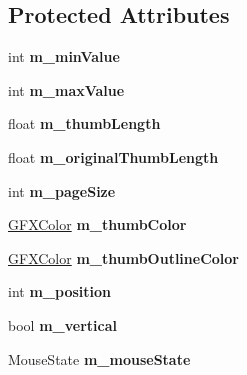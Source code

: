 \subsection*{Protected Attributes}
\begin{DoxyCompactItemize}
\item 
int {\bfseries m\+\_\+min\+Value}\hypertarget{classSlider_a84edf59ddaa7ab97a36d6a1ddb73a77b}{}\label{classSlider_a84edf59ddaa7ab97a36d6a1ddb73a77b}

\item 
int {\bfseries m\+\_\+max\+Value}\hypertarget{classSlider_a393ba2cefa5d20e4274375f6cc6f874d}{}\label{classSlider_a393ba2cefa5d20e4274375f6cc6f874d}

\item 
float {\bfseries m\+\_\+thumb\+Length}\hypertarget{classSlider_a1c7103d35675567e874483534c57cb93}{}\label{classSlider_a1c7103d35675567e874483534c57cb93}

\item 
float {\bfseries m\+\_\+original\+Thumb\+Length}\hypertarget{classSlider_a74d37267136edd8f7213cb875e3cdc1f}{}\label{classSlider_a74d37267136edd8f7213cb875e3cdc1f}

\item 
int {\bfseries m\+\_\+page\+Size}\hypertarget{classSlider_a9aa1e89328c38ae508a2c5b1eed0a86c}{}\label{classSlider_a9aa1e89328c38ae508a2c5b1eed0a86c}

\item 
\hyperlink{structGFXColor}{G\+F\+X\+Color} {\bfseries m\+\_\+thumb\+Color}\hypertarget{classSlider_ac84f80dddcb38992ce34910f45796f6b}{}\label{classSlider_ac84f80dddcb38992ce34910f45796f6b}

\item 
\hyperlink{structGFXColor}{G\+F\+X\+Color} {\bfseries m\+\_\+thumb\+Outline\+Color}\hypertarget{classSlider_a8bbe34930a75129a79193274bb12e3a6}{}\label{classSlider_a8bbe34930a75129a79193274bb12e3a6}

\item 
int {\bfseries m\+\_\+position}\hypertarget{classSlider_af651841a7ea06c964f173f6bde8ce53c}{}\label{classSlider_af651841a7ea06c964f173f6bde8ce53c}

\item 
bool {\bfseries m\+\_\+vertical}\hypertarget{classSlider_a72d9b37ed21cfbadf7fb33db084df8f4}{}\label{classSlider_a72d9b37ed21cfbadf7fb33db084df8f4}

\item 
Mouse\+State {\bfseries m\+\_\+mouse\+State}\hypertarget{classSlider_acb82751e9b4188d12edff1481d2b7611}{}\label{classSlider_acb82751e9b4188d12edff1481d2b7611}


\end{DoxyCompactItemize}
